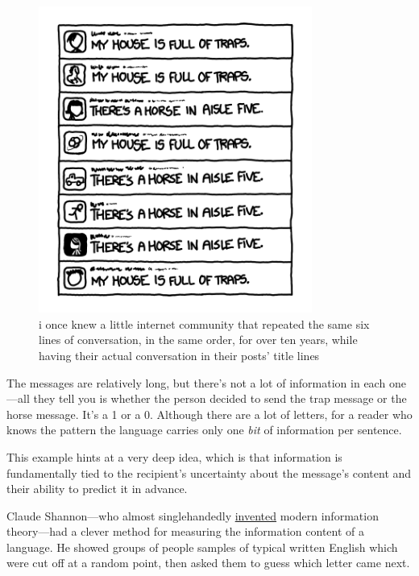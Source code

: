 \begin{figure}[!htbp]
\centering
\includegraphics[scale=0.5, max width=0.8\textwidth]{imgs/a/34/twitter_screenshot.png}
\caption{i once knew a little internet community that repeated the same six lines of conversation, in the same order, for over ten years, while having their actual conversation in their posts' title lines}
\end{figure}

{The messages are relatively long, but there’s not a lot of information in each one—all they tell you is whether the person decided to send the trap message or the horse message. It’s a 1 or a 0. Although there are a lot of letters, for a reader who knows the pattern the language carries only one \emph{bit} of information per sentence.}

{This example hints at a very deep idea, which is that information is fundamentally tied to the recipient’s uncertainty about the message’s content and their ability to predict it in advance.}

{Claude Shannon—who almost singlehandedly \href{http://cm.bell-labs.com/cm/ms/what/shannonday/shannon1948.pdf}{invented} modern information theory—had a clever method for measuring the information content of a language. He showed groups of people samples of typical written English which were cut off at a random point, then asked them to guess which letter came next.}

